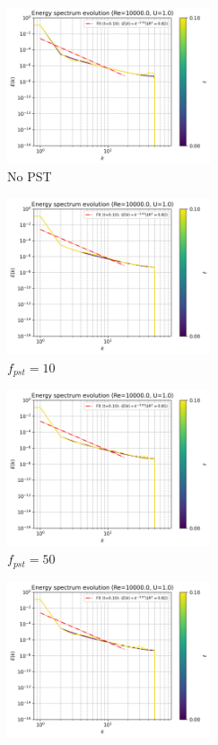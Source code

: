 \begin{figure}[H]
  \begin{subfigure}{7cm}
    \centering\includegraphics[width=6cm]{Code-Figures/deltales/pst/c0_20_tait_pec_dtmul_1_nx_100_pst_-1_re_10000_deltales/energy_spectrum_evolution.png}
    \caption{No PST}
  \end{subfigure}
  \begin{subfigure}{7cm}
    \centering\includegraphics[width=6cm]{Code-Figures/deltales/pst/c0_20_tait_pec_dtmul_1_nx_100_pst_10_re_10000_deltales/energy_spectrum_evolution.png}
    \caption{$f_{pst} = 10$}
  \end{subfigure}
  \begin{subfigure}{7cm}
    \centering\includegraphics[width=6cm]{Code-Figures/deltales/pst/c0_20_tait_pec_dtmul_1_nx_100_pst_50_re_10000_deltales/energy_spectrum_evolution.png}
    \caption{$f_{pst} = 50$}
  \end{subfigure}
  \begin{subfigure}{7cm}
    \centering\includegraphics[width=6cm]{Code-Figures/deltales/pst/c0_20_tait_pec_dtmul_1_nx_100_pst_100_re_10000_deltales/energy_spectrum_evolution.png}

\end{subfigure}
\end{figure}
